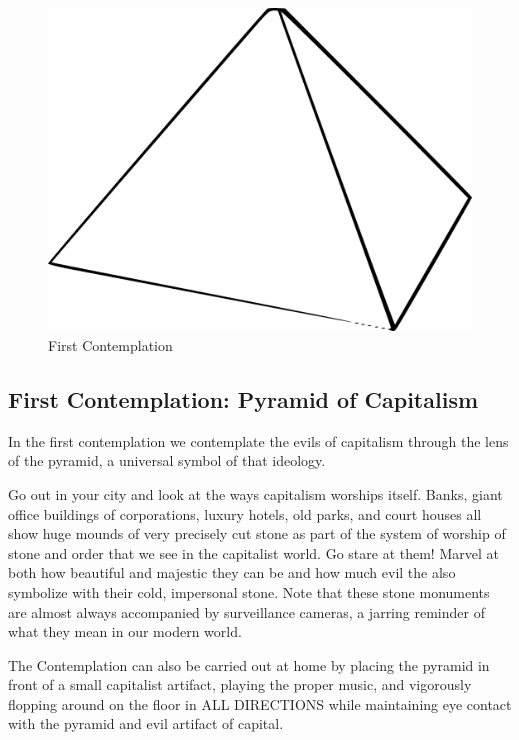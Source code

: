 \begin{figure}[htbp]
\centering
\includegraphics{images/contemplations/contemplation1C.png}
\caption{First Contemplation}
\end{figure}

\subsection{First Contemplation: Pyramid of
Capitalism}\label{first-contemplation-pyramid-of-capitalism}

In the first contemplation we contemplate the evils of capitalism
through the lens of the pyramid, a universal symbol of that ideology.

Go out in your city and look at the ways capitalism worships itself.
Banks, giant office buildings of corporations, luxury hotels, old parks,
and court houses all show huge mounds of very precisely cut stone as
part of the system of worship of stone and order that we see in the
capitalist world. Go stare at them! Marvel at both how beautiful and
majestic they can be and how much evil the also symbolize with their
cold, impersonal stone. Note that these stone monuments are almost
always accompanied by surveillance cameras, a jarring reminder of what
they mean in our modern world.

The Contemplation can also be carried out at home by placing the pyramid
in front of a small capitalist artifact, playing the proper music, and
vigorously flopping around on the floor in ALL DIRECTIONS while
maintaining eye contact with the pyramid and evil artifact of capital.
